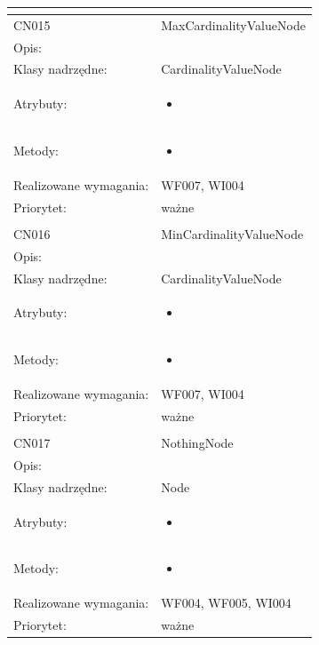 \documentclass[a4paper,10pt]{article}
\begin{document}
\begin{center}
\begin{longtable}{|m{3cm}|m{9cm}|}
\multicolumn{2}{c}{} \\
 \hline

CN015 & MaxCardinalityValueNode \\ \hline
Opis: &     \\ \hline
Klasy nadrzędne: & CardinalityValueNode     \\ \hline
Atrybuty: & \begin{itemize}
 \item 
\end{itemize}
 \\ \hline
Metody: & \begin{itemize}
 \item 
\end{itemize}
  \\ \hline
Realizowane wymagania: & WF007, WI004 \\ \hline
Priorytet: & ważne  \\ \hline

\multicolumn{2}{c}{} \\
 \hline

CN016 & MinCardinalityValueNode \\ \hline
Opis: &     \\ \hline
Klasy nadrzędne: & CardinalityValueNode     \\ \hline
Atrybuty: & \begin{itemize}
 \item 
\end{itemize}
 \\ \hline
Metody: & \begin{itemize}
 \item 
\end{itemize}
  \\ \hline
Realizowane wymagania: & WF007, WI004 \\ \hline
Priorytet: & ważne  \\ \hline

\multicolumn{2}{c}{} \\
 \hline

CN017 & NothingNode \\ \hline
Opis: &     \\ \hline
Klasy nadrzędne: & Node     \\ \hline
Atrybuty: & \begin{itemize}
 \item 
\end{itemize}
 \\ \hline
Metody: & \begin{itemize}
 \item 
\end{itemize}
  \\ \hline
Realizowane wymagania: & WF004, WF005, WI004 \\ \hline
Priorytet: & ważne  \\ \hline


\end{longtable}
\end{center}
\end{document}
